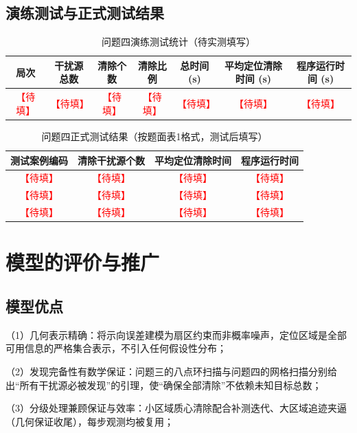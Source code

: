 \documentclass[12pt,a4paper]{ctexart}
\numberwithin{figure}{section}
\numberwithin{table}{section}
\numberwithin{equation}{section}
\newcommand{\TBD}{\textcolor{red}{【待填】}}
\begin{document}
\subsection{演练测试与正式测试结果}

\begin{table}[H]
\centering
\caption{问题四演练测试统计（待实测填写）}
\label{tab:q4-stats}
\begin{tabular}{ccccccc}
\toprule
局次 & 干扰源总数 & 清除个数 & 清除比例 & 总时间 (s) & 平均定位清除时间 (s) & 程序运行时间 (s) \\
\midrule
\TBD & \TBD & \TBD & \TBD & \TBD & \TBD & \TBD \\
\bottomrule
\end{tabular}
\end{table}

\begin{table}[H]
\centering
\caption{问题四正式测试结果（按题面表1格式，测试后填写）}
\label{tab:q4-formal}
\begin{tabular}{cccc}
\toprule
测试案例编码 & 清除干扰源个数 & 平均定位清除时间 & 程序运行时间 \\
\midrule
\TBD & \TBD & \TBD & \TBD \\
\TBD & \TBD & \TBD & \TBD \\
\TBD & \TBD & \TBD & \TBD \\
\bottomrule
\end{tabular}
\end{table}

\section{模型的评价与推广}

\subsection{模型优点}

（1）几何表示精确：将示向误差建模为扇区约束而非概率噪声，定位区域是全部可用信息的严格集合表示，不引入任何假设性分布；

（2）发现完备性有数学保证：问题三的八点环扫描与问题四的网格扫描分别给出“所有干扰源必被发现”的引理，使“确保全部清除”不依赖未知目标总数；

（3）分级处理兼顾保证与效率：小区域质心清除配合补测迭代、大区域追迹夹逼（几何保证收尾），每步观测均被复用；
\end{document}
